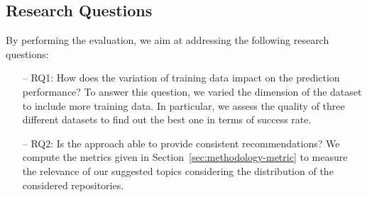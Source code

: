 \subsection{Research Questions} \label{sec:ResearchQuestions}
By performing the evaluation, we aim at addressing the following research questions:
\begin{itemize}
\item[--] RQ1: How does the variation of training data impact on the prediction performance? To answer this question, we varied the dimension of the dataset to include more training data. In particular, we assess the quality of three different datasets to find out the best one in terms of success rate.
\item[--] RQ2: Is the approach able to provide consistent recommendations? We compute the metrics given in Section~\ref{sec:methodology-metric} to measure the relevance of our suggested topics considering the distribution of the considered repositories.
\end{itemize}

